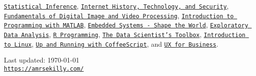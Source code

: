 \documentclass[letterpaper]{article}
\def\footerlink{https://amrsekilly.com/}
\renewenvironment{itemize}{
  \begin{list}{}{
    \setlength{\leftmargin}{1.5em}
  }
}{
  \end{list}
}
\begin{document}
\begin{itemize}
  \href{https://www.coursera.org/account/accomplishments/verify/CQ6WJYN4Z9?lipi=urn%3Ali%3Apage%3Ad_flagship3_profile_view_base%3Bot6rr9dtS3WBieVYcbWG0Q%3D%3D}{\tt Statistical Inference},
  \href{https://www.coursera.org/account/accomplishments/verify/B27UUFAW57GT?lipi=urn%3Ali%3Apage%3Ad_flagship3_profile_view_base%3Bot6rr9dtS3WBieVYcbWG0Q%3D%3D}{\tt Internet History, Technology, and Security},
  \href{https://www.coursera.org/account/accomplishments/verify/SP3ZV5AB8W?lipi=urn%3Ali%3Apage%3Ad_flagship3_profile_view_base%3Bot6rr9dtS3WBieVYcbWG0Q%3D%3D}{\tt Fundamentals of Digital Image and Video Processing},
  \href{https://www.coursera.org/account/accomplishments/verify/CAWM4BQMRF?lipi=urn%3Ali%3Apage%3Ad_flagship3_profile_view_base%3Bot6rr9dtS3WBieVYcbWG0Q%3D%3D}{\tt Introduction to Programming with MATLAB},
  \href{https://s3.amazonaws.com/verify.edx.org/downloads/6486e2593cd249ec8e0dcd039af1e641/Certificate.pdf?lipi=urn%3Ali%3Apage%3Ad_flagship3_profile_view_base%3Bot6rr9dtS3WBieVYcbWG0Q%3D%3D}{\tt Embedded Systems - Shape the World},
  \href{https://www.coursera.org/account/accomplishments/verify/ZTQXAN3BZX?lipi=urn%3Ali%3Apage%3Ad_flagship3_profile_view_base%3Bot6rr9dtS3WBieVYcbWG0Q%3D%3D}{\tt Exploratory Data Analysis},
  \href{https://www.coursera.org/account/accomplishments/verify/WUJXVCNKKQ?lipi=urn%3Ali%3Apage%3Ad_flagship3_profile_view_base%3Bot6rr9dtS3WBieVYcbWG0Q%3D%3D}{\tt R Programming},
  \href{https://www.coursera.org/account/accomplishments/verify/XT3MCYX63B?lipi=urn%3Ali%3Apage%3Ad_flagship3_profile_view_base%3Bot6rr9dtS3WBieVYcbWG0Q%3D%3D}{\tt The Data Scientist's Toolbox},
  \href{https://s3.amazonaws.com/verify.edx.org/downloads/bf7d4d9034f14fe8be6ea4125e11993b/Certificate.pdf?lipi=urn%3Ali%3Apage%3Ad_flagship3_profile_view_base%3Bot6rr9dtS3WBieVYcbWG0Q%3D%3D}{\tt Introduction to Linux},
  \href{http://www.lynda.com/ViewCertificate/85F2DAA3260C4BA98DEC45D0ABA1D7BB?utm_source=linkedin&utm_medium=sharing&utm_campaign=certificate&lipi=urn%3Ali%3Apage%3Ad_flagship3_profile_view_base%3Bot6rr9dtS3WBieVYcbWG0Q%3D%3D}{\tt Up and Running with CoffeeScript},
  and \href{http://www.lynda.com/ViewCertificate/9C844FF3475A42F6AF0A5E7377F7C9EB?utm_source=linkedin&utm_medium=sharing&utm_campaign=certificate&lipi=urn%3Ali%3Apage%3Ad_flagship3_profile_view_base%3Bot6rr9dtS3WBieVYcbWG0Q%3D%3D}{\tt UX for Business}.


\end{itemize}

\bigskip

\begin{center}
  \begin{footnotesize}
    Last updated: \today \\
    \href{\footerlink}{\texttt{\footerlink}}
  \end{footnotesize}
\end{center}
\end{document}
